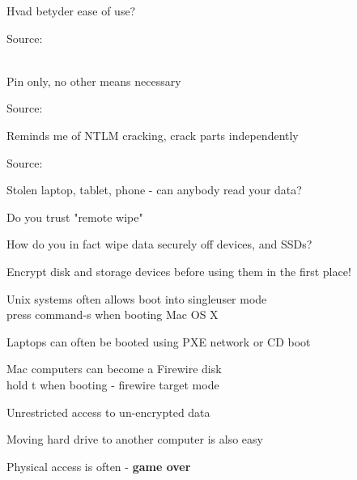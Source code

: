 \documentclass[20pt,landscape,a4paper,footrule]{foils}
\begin{document}
\centerline{Hvad betyder ease of use?}

Source: \\
\\
{\footnotesize {}}



\centerline{Pin only, no other means necessary}

Source:\\





\centerline{Reminds me of NTLM cracking, crack parts independently}

Source:\\





\begin{list1}
\item Stolen laptop, tablet, phone - can anybody read your data?
\item Do you trust "remote wipe"
\item How do you in fact wipe data securely off devices, and SSDs?
\item Encrypt disk and storage devices before using them in the first place!
\end{list1}


\begin{list1}
\item Unix systems often allows boot into singleuser mode\\
press command-s when booting Mac OS X
\item Laptops can often be booted using PXE network or CD boot
\item Mac computers can become a Firewire disk\\
hold t when booting - firewire target mode
\item Unrestricted access to un-encrypted data
\item Moving hard drive to another computer is also easy
\end{list1}
\pause
\centerline{Physical access is often - {\bf game over}}
\end{document}
